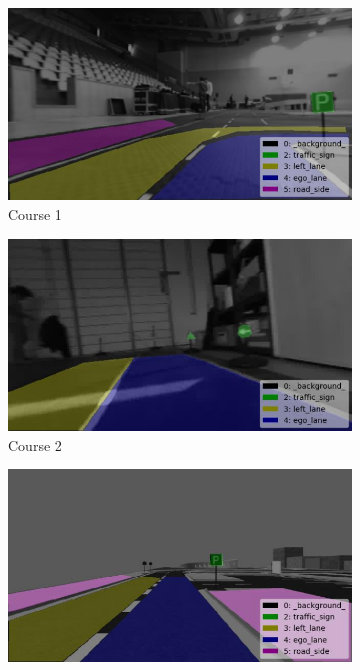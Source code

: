 \begin{figure}[h]
  \centering
  \begin{subfigure}[b]{0.4\linewidth}
      \includegraphics[width=\linewidth]{figures/course1.jpg}
    \caption{Course 1}
  \end{subfigure}
  \begin{subfigure}[b]{0.4\linewidth}
      \includegraphics[width=\linewidth]{figures/course2.jpg}
    \caption{Course 2}
  \end{subfigure}
  \begin{subfigure}[b]{0.4\linewidth}
      \includegraphics[width=\linewidth]{figures/course3.jpg}

\end{subfigure}
\end{figure}
